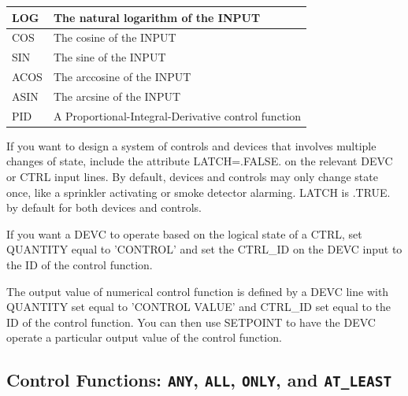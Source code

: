 \documentclass[11pt]{book}
\begin{document}
\begin{table}[h!]
\begin{center}
\begin{tabular}{|l||l|}
{\ct LOG}                       & The natural logarithm of the {\ct INPUT} \\ \hline
{\ct COS}                       & The cosine of the {\ct INPUT} \\ \hline
{\ct SIN}                       & The sine of the {\ct INPUT} \\ \hline
{\ct ACOS}                       & The arccosine of the {\ct INPUT} \\ \hline
{\ct ASIN}                       & The arcsine of the {\ct INPUT} \\ \hline
{\ct PID}                         & A Proportional-Integral-Derivative control function \\ \hline
\end{tabular}
\end{center}
\end{table}

If you want to design a system of controls and devices that involves multiple changes of state, include the attribute {\ct LATCH=.FALSE.} on the relevant {\ct DEVC} or {\ct CTRL} input lines. By default, devices and controls may only change state once, like a sprinkler activating or smoke detector alarming. {\ct LATCH} is {\ct .TRUE.} by default for both devices and controls.

If you want a {\ct DEVC} to operate based on the logical state of a {\ct CTRL}, set {\ct QUANTITY} equal to {\ct 'CONTROL'} and set the {\ct CTRL\_ID} on the {\ct DEVC} input to the {\ct ID} of the control function.

The output value of numerical control function is defined by a {\ct DEVC} line with {\ct QUANTITY} set equal to {\ct 'CONTROL VALUE'} and {\ct CTRL\_ID} set equal to the {\ct ID} of the control function.  You can then use {\ct SETPOINT} to have the {\ct DEVC} operate a particular output value of the control function.


\subsection{Control Functions: \texorpdfstring{{\tt ANY}}{ANY}, \texorpdfstring{{\tt ALL}}{ALL}, \texorpdfstring{{\tt ONLY}}{ONLY}, and
\texorpdfstring{{\tt AT\_LEAST}}{AT\_LEAST}}

\label{info:FUNCTION_TYPE}
\end{document}

